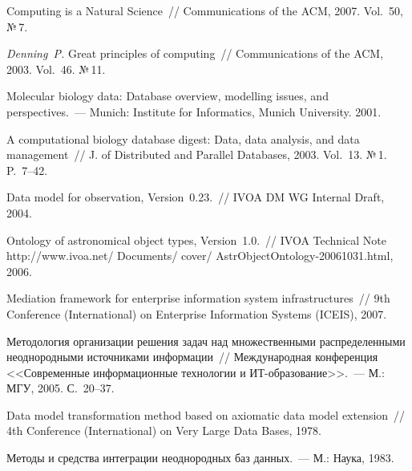\begin{multicols}{2}

{\small\frenchspacing
{%
\begin{thebibliography}{99}
Computing is a Natural Science~//
Communications of the ACM, 2007. Vol.~50, №\,7.

{\it Denning~P.}
Great principles of computing~//
Communications of the ACM, 2003. Vol.~46. №\,11.

Molecular biology data: Database overview, modelling issues, and
perspectives.~---
Munich: Institute for Informatics, Munich University. 2001.

A computational biology database digest: Data, data analysis, and data
management~//
J. of Distributed and Parallel Databases, 2003. Vol.~13. №\,1. P.~7--42.

Data model for observation, Version~0.23.~//
IVOA DM WG Internal Draft, 2004.

Ontology of astronomical object types, Version~1.0.~//
IVOA Technical Note
{\sf http://www.ivoa.net/ Documents/ cover/ AstrObjectOntology-20061031.html}, 2006.

Mediation framework for enterprise information system infrastructures~//
9th Conference (International) on Enterprise Information Systems (ICEIS),
2007.

Методология организации решения задач над
множественными распределенными неоднородными источниками информации~//
Международная конференция <<Современные информационные
технологии и ИТ-образование>>.~--- М.: МГУ, 2005. С.~20--37.

Data model transformation method based on axiomatic data model extension~//
4th Conference (International) on Very Large Data Bases, 1978.

Методы и средства интеграции неоднородных баз данных.~---
М.: Наука, 1983.


\end{thebibliography}}}
\end{multicols}
